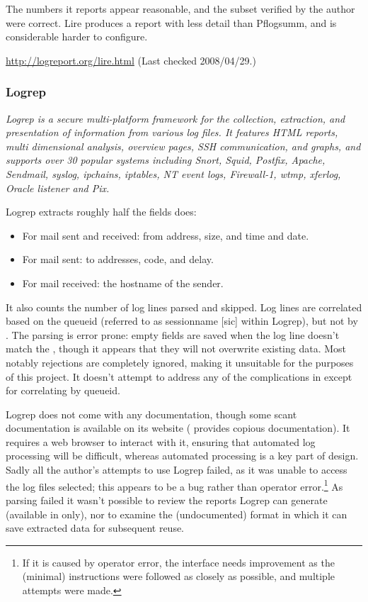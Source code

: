 The numbers it reports appear reasonable, and the subset verified by the
author were correct.  Lire produces a report with less detail than
Pflogsumm, and is considerable harder to configure.

\url{http://logreport.org/lire.html} \newline (Last checked 2008/04/29.)

\subsubsection{Logrep}

\textit{Logrep is a secure multi-platform framework for the collection,
extraction, and presentation of information from various log files. It
features HTML reports, multi dimensional analysis, overview pages, SSH
communication, and graphs, and supports over 30 popular systems including
Snort, Squid, Postfix, Apache, Sendmail, syslog, ipchains, iptables, NT
event logs, Firewall-1, wtmp, xferlog, Oracle listener and Pix.\/}

Logrep extracts roughly half the fields \parsername{} does:

\begin{itemize}

    \item For mail sent and received: from address, size, and time and
        date.

    \item For mail sent: to addresses, \SMTP{} code, and delay.

    \item For mail received: the hostname of the sender.

\end{itemize}

It also counts the number of log lines parsed and skipped.  Log lines are
correlated based on the queueid (referred to as sessionname [sic] within
Logrep), but not by \pid{}.  The parsing is error prone: empty fields are
saved when the log line doesn't match the \regex{}, though it appears that
they will not overwrite existing data.  Most notably rejections are
completely ignored, making it unsuitable for the purposes of this project.
It doesn't attempt to address any of the complications in
  except for
correlating by queueid.

Logrep does not come with any documentation, though some scant
documentation is available on its website (\parsername{} provides copious
documentation).  It requires a web browser to interact with it, ensuring
that automated log processing will be difficult, whereas automated
processing is a key part of \parsernames{} design.  Sadly all the author's
attempts to use Logrep failed, as it was unable to access the log files
selected; this appears to be a bug rather than operator error.\footnote{If
it is caused by operator error, the interface needs improvement as the
(minimal) instructions were followed as closely as possible, and multiple
attempts were made.}  As parsing failed it wasn't possible to review the
reports Logrep can generate (available in \HTML{} only), nor to examine the
(undocumented) format in which it can save extracted data for subsequent
reuse.

